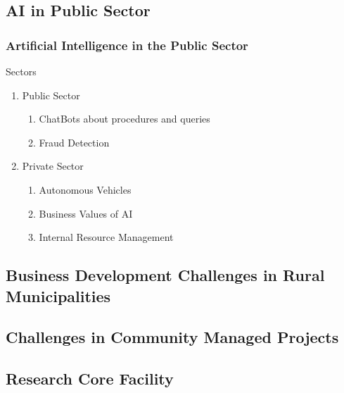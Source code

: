 \subsection{AI in Public Sector}
\begin{frame}
    \frametitle{Artificial Intelligence in the Public Sector}

    \begin{exampleblock}{Sectors}
        \begin{enumerate}
            \item Public Sector
            \begin{enumerate}
                \item ChatBots about procedures and queries
                \item Fraud Detection
                
            \end{enumerate}
            \item Private Sector
            \begin{enumerate}
                \item Autonomous Vehicles
                \item Business Values of AI
                \item Internal Resource Management
            \end{enumerate}
        \end{enumerate}
    \end{exampleblock}
\end{frame}

\subsection{Business Development Challenges in Rural Municipalities}

\subsection{Challenges in Community Managed Projects}

\subsection{Research Core Facility}

